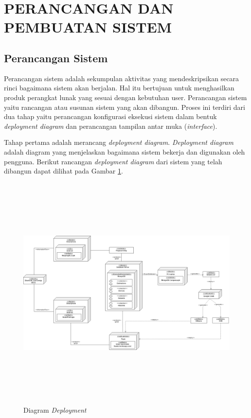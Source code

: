 \section{PERANCANGAN DAN PEMBUATAN SISTEM}

\subsection{Perancangan Sistem}

\par Perancangan sistem adalah sekumpulan aktivitas yang mendeskripsikan secara rinci bagaimana sistem akan berjalan. Hal itu bertujuan untuk menghasilkan produk perangkat lunak yang sesuai dengan kebutuhan user. Perancangan sistem yaitu rancangan atau susunan sistem yang akan dibangun. Proses ini terdiri dari dua tahap yaitu perancangan konfigurasi eksekusi sistem dalam bentuk \textit{deployment diagram} dan perancangan tampilan antar muka (\textit{interface}).

Tahap pertama adalah merancang \textit{deployment diagram}. \textit{Deployment diagram} adalah diagram yang menjelaskan bagaimana sistem bekerja dan digunakan oleh pengguna. Berikut rancangan \textit{deployment diagram} dari sistem yang telah dibangun dapat dilihat pada Gambar \ref{deployment-diagram}.

\vspace{-0.2cm}
\begin{landscape}
	\begin{figure}[H]
		\center
		\includegraphics [width = 22.5cm, height=12cm]{gambar/model/diagramdeployment.png}
		\caption{Diagram \textit{Deployment}}
		\label{deployment-diagram}
	\end{figure}
\end{landscape}

